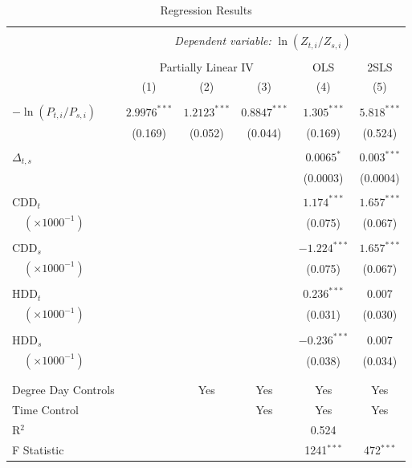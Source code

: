 \documentclass[11pt,a4paper,leqno]{extarticle}
\begin{document}
		
	\begin{table}[!h] \centering 
		\caption{Regression Results}
		\label{table:regcombined} 
		\small
		\begin{tabular}{@{\extracolsep{5pt}}lccccc} 
			\\[-4ex]\hline  
			\hline \\[-1.8ex] 
			& \multicolumn{5}{c}{\textit{Dependent variable:} $\ln (Z_{ t, i} / Z_{ s, i})$} \\ [0.5ex]
			\cline{1-6} \\ [-1.5ex]
			& \multicolumn{3}{c}{Partially Linear IV} & OLS & 2SLS \\[0.5ex]
		 & (1) & (2) & (3) & (4) & (5) \\ [0.5ex]
			\hline \\[-1.8ex] 
			$-\ln (P_{t,i} / P_{s,i})$ & $2.9976^{***}$ & $1.2123^{***}$ & $0.8847^{***}$ & $1.305^{***}$ & $5.818^{***}$ \\
			& (0.169)& (0.052) & (0.044) & (0.169) & (0.524) \\
			& \\
			$\Delta_{t,s}$ & & & & $0.0065^{*}$ & $0.003^{***}$ \\
			& & & & (0.0003) & (0.0004) \\
			& \\
			CDD$_{t}$ & & & & $1.174^{***}$ & $1.657^{***}$ \\
			$\quad(\times 1000^{-1})$& & & & (0.075) & (0.067) \\
			& \\
			CDD$_{s}$ & & & & $-1.224^{***}$ & $1.657^{***}$ \\
			$\quad(\times 1000^{-1})$& & & & (0.075) & (0.067) \\
			& \\
			HDD$_{t}$ & & & & $0.236^{***}$ & 0.007 \\
			$\quad(\times 1000^{-1})$& & & & (0.031) & (0.030) \\
			& \\
			HDD$_{s}$ & & & & $-0.236^{***}$ & 0.007 \\
			$\quad(\times 1000^{-1})$& & & & (0.038) & (0.034) \\
			& \\
			\hline \\[-1.8ex] 
			Degree Day Controls & & Yes & Yes & Yes & Yes \\
			Time Control & &   & Yes  & Yes & Yes \\ 
			R$^{2}$  & & &  & 0.524 &   \\ 
			F Statistic & & & &   1241$^{***}$ & 472$^{***}$  \\ [0.5ex]

\end{tabular}
\end{table}
\end{document}
